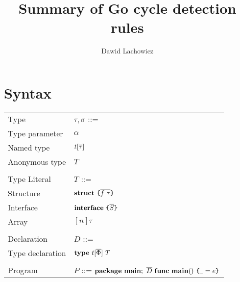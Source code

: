 \documentclass[12pt]{article}
\title{Summary of Go cycle detection rules}
\author{Dawid Lachowicz}
\begin{document}
\maketitle

\section{Syntax}


\begin{minipage}[t]{\textwidth}
    \begin{tabular}[t]{ll}
        Type                   & $\tau, \sigma$ ::=                                        \\
        \quad Type parameter   & \quad $\alpha$                                            \\
        \quad Named type       & \quad $t[\overline{\tau}]$                                      \\
        \quad Anonymous type   & \quad $T$                                                 \\\\
        Type Literal           & $T$ ::=                                                   \\
        \quad Structure        & \quad $\texttt{\bf struct}~\texttt{\{}\overline{f~\tau}\texttt{\}}$                          \\
        \quad Interface        & \quad $\texttt{\bf interface}~\texttt{\{}\overline{S}\texttt{\}}$                            \\
        \quad Array            & \quad$[n]\tau$                                            \\
        \\
        Declaration            & $D$ ::=                                                   \\
        \quad Type declaration & \quad $\texttt{\bf type}~t[\overline{\Phi}]~T$                              \\
        \\
        Program                & $P$ ::= $\texttt{\bf package}~\texttt{\bf main};~\overline{D}~\texttt{\bf func}~\texttt{\bf main}()~\texttt{\{}\texttt{\textunderscore}=e\texttt{\}}$
    \end{tabular}
\end{minipage}
\hspace{-0.5\textwidth}
\end{document}
